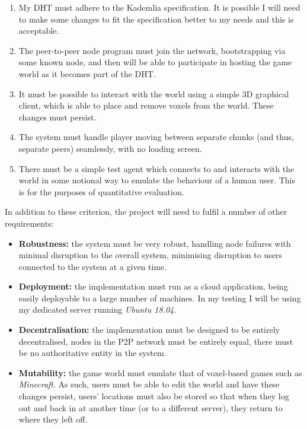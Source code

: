 \documentclass[12pt,notitlepage,a4paper]{report}
\begin{document}
	\begin{enumerate}
		\item My DHT must adhere to the Kademlia specification. It is possible I will need to make some changes to fit the specification better to my needs and this is acceptable.
		\item The peer-to-peer node program must join the network, bootstrapping via some known node, and then will be able to participate in hosting the game world as it becomes part of the DHT.
		\item It must be possible to interact with the world using a simple 3D graphical client, which is able to place and remove voxels from the world. These changes must persist.
		\item The system must handle player moving between separate chunks (and thus, separate peers) seamlessly, with no loading screen.
		\item There must be a simple test agent which connects to and interacts with the world in some notional way to emulate the behaviour of a human user. This is for the purposes of quantitative evaluation.
	\end{enumerate}

	In addition to these criterion, the project will need to fulfil a number of other requirements:
	
	\begin{itemize}
		\item \textbf{Robustness:} the system must be very robust, handling node failures with minimal disruption to the overall system, minimising disruption to users connected to the system at a given time.
		\item \textbf{Deployment:} the implementation must run as a cloud application, being easily deployable to a large number of machines. In my testing I will be using my dedicated server running \emph{Ubuntu 18.04}.
		\item \textbf{Decentralisation:} the implementation must be designed to be entirely decentralised, nodes in the P2P network must be entirely equal, there must be no authoritative entity in the system.
		\item \textbf{Mutability:} the game world must emulate that of voxel-based games such as \emph{Minecraft}. As such, users must be able to edit the world and have these changes persist, users' locations must also be stored so that when they log out and back in at another time (or to a different server), they return to where they left off.
	\end{itemize}
\end{document}
